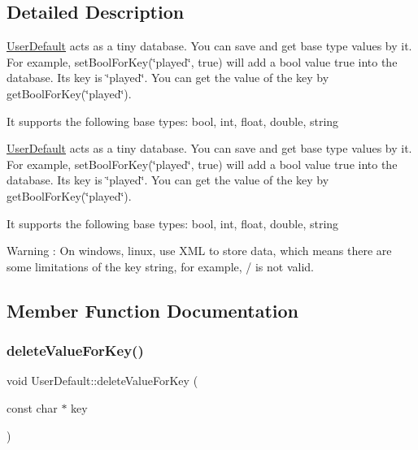 \subsection{Detailed Description}
\hyperlink{classUserDefault}{User\+Default} acts as a tiny database. You can save and get base type values by it. For example, set\+Bool\+For\+Key(\char`\"{}played\char`\"{}, true) will add a bool value true into the database. Its key is \char`\"{}played\char`\"{}. You can get the value of the key by get\+Bool\+For\+Key(\char`\"{}played\char`\"{}).

It supports the following base types\+: bool, int, float, double, string

\hyperlink{classUserDefault}{User\+Default} acts as a tiny database. You can save and get base type values by it. For example, set\+Bool\+For\+Key(\char`\"{}played\char`\"{}, true) will add a bool value true into the database. Its key is \char`\"{}played\char`\"{}. You can get the value of the key by get\+Bool\+For\+Key(\char`\"{}played\char`\"{}).

It supports the following base types\+: bool, int, float, double, string

\begin{DoxyWarning}{Warning}
\+: On windows, linux, use X\+ML to store data, which means there are some limitations of the key string, for example, {\ttfamily /} is not valid. 
\end{DoxyWarning}


\subsection{Member Function Documentation}
\mbox{\label{classUserDefault_a461d5709bb8bfcfa478a94944e8f5144}} 
\subsubsection{\texorpdfstring{delete\+Value\+For\+Key()}{deleteValueForKey()}\hspace{0.1cm}{\footnotesize\ttfamily [1/2]}}
{\footnotesize\ttfamily void User\+Default\+::delete\+Value\+For\+Key (\begin{DoxyParamCaption}\item[{const char $\ast$}]{key }\end{DoxyParamCaption})\hspace{0.3cm}{\ttfamily [virtual]}}

